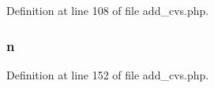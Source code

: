 \-Definition at line 108 of file add\-\_\-cvs.\-php.

\hypertarget{add__cvs_8php_ab1b2829a7425bcec97d0ab4e6b3c77f2}{
\subsubsection[{n}]{ {\bf n}}}\label{add__cvs_8php_ab1b2829a7425bcec97d0ab4e6b3c77f2}


\-Definition at line 152 of file add\-\_\-cvs.\-php.

